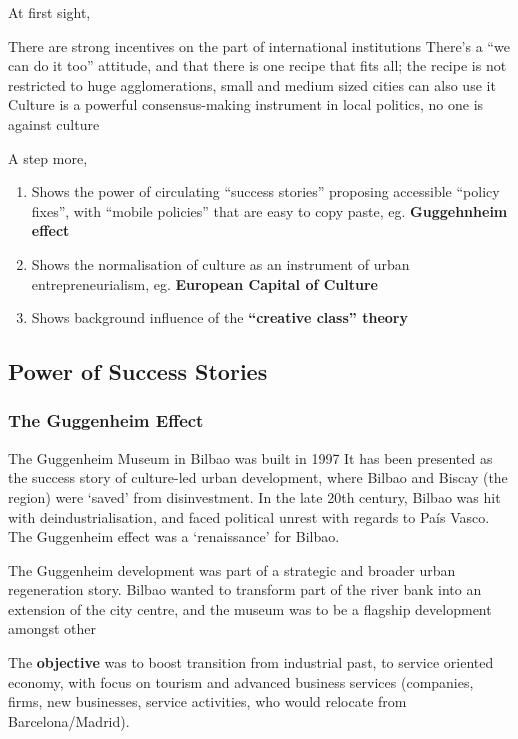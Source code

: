 \documentclass{article}
\begin{document}
At first sight, 

\begin{outline}
	\1 There are strong incentives on the part of international institutions
	\1 There's a ``we can do it too'' attitude, and that there is one recipe that fits all; the recipe is not restricted to huge agglomerations, small and medium sized cities can also use it
	\1 Culture is a powerful consensus-making instrument in local politics, no one is against culture
\end{outline}

A step more,
\begin{enumerate}
	\item Shows the power of circulating ``success stories'' proposing accessible ``policy fixes'', with ``mobile policies'' that are easy to copy paste, eg. \textbf{Guggehnheim effect}
	\item Shows the normalisation of culture as an instrument of urban entrepreneurialism, eg.  \textbf{European Capital of Culture}
	\item Shows background influence of the  \textbf{``creative class'' theory}
\end{enumerate}

\subsection{Power of Success Stories}

\subsubsection{The Guggenheim Effect}

The Guggenheim Museum in Bilbao was built in 1997
It has been presented as the success story of culture-led urban development, where Bilbao and Biscay (the region) were `saved' from disinvestment. In the late 20th century, Bilbao was hit with deindustrialisation, and faced political unrest with regards to País Vasco. The Guggenheim effect  was a `renaissance' for Bilbao.

The Guggenheim development was part of a strategic and broader urban regeneration story. Bilbao wanted to transform part of the river bank into an extension of the city centre, and the museum was to be a flagship development amongst other 

The \textbf{objective} was to boost transition from industrial past, to service oriented economy, with focus on tourism and advanced business services (companies, firms, new businesses, service activities, who would relocate from Barcelona/Madrid).
\end{document}

